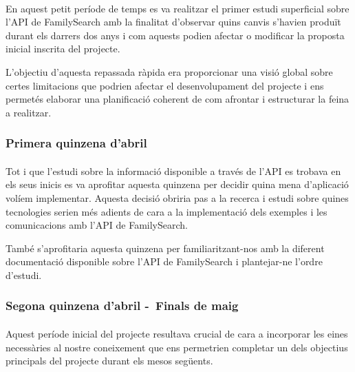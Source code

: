            \paragraph{}
            En aquest petit període de temps es va realitzar el primer estudi superficial sobre l'\gls{API} de FamilySearch amb la finalitat d’observar quins canvis s'havien produït durant els darrers dos anys i com aquests podien afectar o modificar la proposta inicial inscrita del projecte.

            L'objectiu d'aquesta repassada ràpida era proporcionar una visió global sobre certes limitacions que podrien afectar el desenvolupament del projecte i ens permetés elaborar una planificació coherent de com afrontar i estructurar la feina a realitzar.

        \subsubsection{Primera quinzena d'abril}

            \paragraph{}
            Tot i que l’estudi sobre la informació disponible a través de l'\gls{API} es trobava en els seus inicis es va aprofitar aquesta quinzena per decidir quina mena d’aplicació volíem implementar. Aquesta decisió obriria pas a la recerca i estudi sobre quines tecnologies serien més adients de cara a la implementació dels exemples i les comunicacions amb l'\gls{API} de FamilySearch.

            També s'aprofitaria aquesta quinzena per familiaritzant-nos amb la diferent do\-cu\-men\-ta\-ció disponible sobre l'\gls{API} de FamilySearch i plantejar-ne l’ordre d'estudi.

        \subsubsection{Segona quinzena d'abril -\ Finals de maig}

            \paragraph{}
            Aquest període inicial del projecte resultava crucial de cara a incorporar les eines necessàries al nostre coneixement que ens permetrien completar un dels objectius principals del projecte durant els mesos següents.

